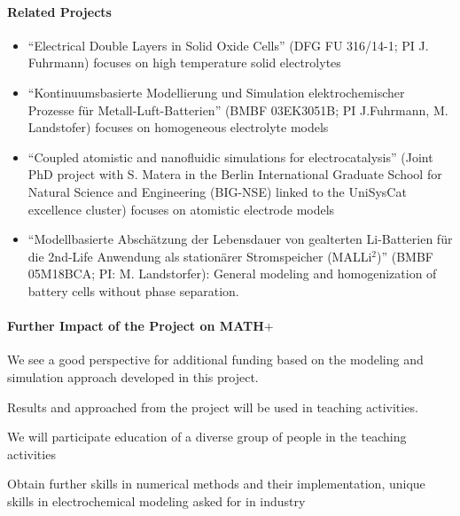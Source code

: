 \documentclass[a4paper,10pt]{article}
\begin{document}
\paragraph{Related Projects}
\begin{itemize}
\item ``Electrical Double Layers in Solid Oxide Cells'' (DFG FU 316/14-1; PI J. Fuhrmann) focuses
  on high temperature solid electrolytes
\item ``Kontinuumsbasierte Modellierung und Simulation elektrochemischer Prozesse für Metall-Luft-Batterien''
  (BMBF  03EK3051B; PI J.Fuhrmann, M. Landstofer) focuses on homogeneous electrolyte models
\item ``Coupled atomistic and nanofluidic simulations for electrocatalysis'' (Joint PhD project with S. Matera
  in the  Berlin International Graduate School for Natural Science and Engineering (BIG-NSE) linked
  to the UniSysCat excellence cluster) focuses on atomistic electrode models
\item ``Modellbasierte Abschätzung der Lebensdauer von gealterten Li-Batterien für die 2nd-Life Anwendung als stationärer
  Stromspeicher (MALLi$^2$)'' (BMBF 05M18BCA; PI: M. Landstorfer): General modeling and homogenization of battery cells
  without phase separation.
\end{itemize}

\paragraph{Further Impact of the Project on MATH$+$}
We see a good perspective for additional funding based on the modeling and simulation approach
developed in this project.

Results and approached from the project will be used in teaching activities.

We will participate education of a diverse group of people in the teaching activities

Obtain further skills in numerical methods and their implementation, unique skills in electrochemical
modeling asked for in  industry
\end{document}
